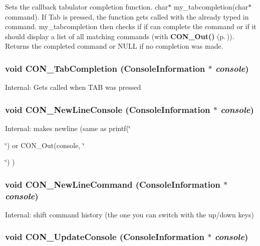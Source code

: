 Sets the callback tabulator completion function. char$\ast$ my\_\-tabcompletion(char$\ast$ command). If Tab is pressed, the function gets called with the already typed in command. my\_\-tabcompletion then checks if if can complete the command or if it should display a list of all matching commands (with {\bf CON\_\-Out()} {\rm (p.\,\pageref{CON__console_8h_a18})}). Returns the  completed command or NULL if no completion was made. 
\subsubsection{\setlength{\rightskip}{0pt plus 5cm}void CON\_\-Tab\-Completion ({\bf Console\-Information} $\ast$ {\em console})}\label{CON__console_8h_a30}


Internal: Gets called when TAB was pressed 
\subsubsection{\setlength{\rightskip}{0pt plus 5cm}void CON\_\-New\-Line\-Console ({\bf Console\-Information} $\ast$ {\em console})}\label{CON__console_8h_a31}


Internal: makes newline (same as printf(\char`\"{}\par
\char`\"{}) or CON\_\-Out(console, \char`\"{}\par
\char`\"{}) ) 
\subsubsection{\setlength{\rightskip}{0pt plus 5cm}void CON\_\-New\-Line\-Command ({\bf Console\-Information} $\ast$ {\em console})}\label{CON__console_8h_a32}


Internal: shift command history (the one you can switch with the up/down keys) 
\subsubsection{\setlength{\rightskip}{0pt plus 5cm}void CON\_\-Update\-Console ({\bf Console\-Information} $\ast$ {\em console})}\label{CON__console_8h_a33}


